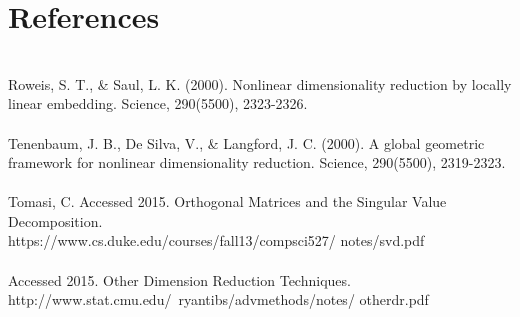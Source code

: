 \documentclass[11pt]{article}
\begin{document}

\section*{References}
\mbox{} \\
Roweis, S. T., \& Saul, L. K. (2000). Nonlinear dimensionality reduction by locally linear embedding. Science, 290(5500), 2323-2326. \\
\mbox{} \\
Tenenbaum, J. B., De Silva, V., \& Langford, J. C. (2000). A global geometric framework for nonlinear dimensionality reduction. Science, 290(5500), 2319-2323. \\
\mbox{} \\
Tomasi, C. Accessed 2015. Orthogonal Matrices and the Singular Value Decomposition.\\
https://www.cs.duke.edu/courses/fall13/compsci527/ notes/svd.pdf \\
\mbox{} \\
Accessed 2015. Other Dimension Reduction Techniques. \\
http://www.stat.cmu.edu/~ryantibs/advmethods/notes/ otherdr.pdf \\
\mbox{} \\


\end{document}
